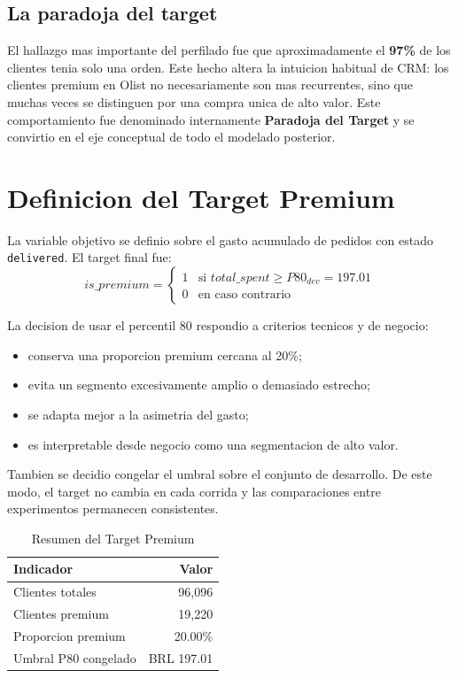 \documentclass[12pt,letterpaper]{article}
\begin{document}
\subsection{La paradoja del target}
El hallazgo mas importante del perfilado fue que aproximadamente el \textbf{97\%} de los clientes tenia solo una orden. Este hecho altera la intuicion habitual de CRM: los clientes premium en Olist no necesariamente son mas recurrentes, sino que muchas veces se distinguen por una compra unica de alto valor. Este comportamiento fue denominado internamente \textbf{Paradoja del Target} y se convirtio en el eje conceptual de todo el modelado posterior.

\section{Definicion del Target Premium}
La variable objetivo se definio sobre el gasto acumulado de pedidos con estado \texttt{delivered}. El target final fue:
\begin{equation}
is\_premium =
\begin{cases}
1 & \text{si } total\_spent \geq P80_{dev} = 197.01 \\
0 & \text{en caso contrario}
\end{cases}
\end{equation}

La decision de usar el percentil 80 respondio a criterios tecnicos y de negocio:
\begin{itemize}
    \item conserva una proporcion premium cercana al 20\%;
    \item evita un segmento excesivamente amplio o demasiado estrecho;
    \item se adapta mejor a la asimetria del gasto;
    \item es interpretable desde negocio como una segmentacion de alto valor.
\end{itemize}

Tambien se decidio congelar el umbral sobre el conjunto de desarrollo. De este modo, el target no cambia en cada corrida y las comparaciones entre experimentos permanecen consistentes.

\begin{table}[h]
\centering
\caption{Resumen del Target Premium}
\label{tab:ext_target}
\begin{tabular}{lr}
\toprule
Indicador & Valor \\
\midrule
Clientes totales & 96,096 \\
Clientes premium & 19,220 \\
Proporcion premium & 20.00\% \\
Umbral P80 congelado & BRL 197.01 \\
\bottomrule
\end{tabular}
\end{table}
\end{document}
